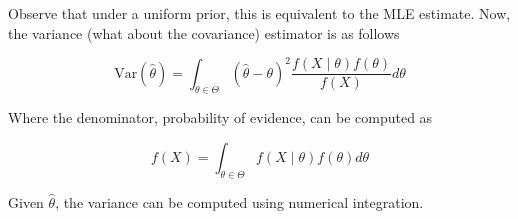 \documentclass[12pt]{article}
\newcommand{\f}[1]{{f\left(#1\right) }}
\newcommand{\fcond}[2]{{f\left(#1\;|\;#2\right) }}
\begin{document}
Observe that under a uniform prior, this is equivalent to the MLE estimate. Now, the variance (what about the covariance) estimator is as follows

\begin{equation}
\label{eq:mapvar}
\mbox{Var}\left(\hat\theta\right) = \int_{\theta \in \Theta} \left(\hat\theta - \theta\right)^2
\frac{\fcond{X}{\theta}\f{\theta}}{\f{X}} d\theta \tag{MAP variance}
\end{equation}

Where the denominator, probability of evidence, can be computed as

$$
\label{eq:d}
\f{X} = \int_{\theta \in \Theta} \fcond{X}{\theta}\f{\theta}d\theta 
$$

Given $\hat \theta$, the variance can be computed using numerical integration.


\appendix

\section{}
\end{document}
